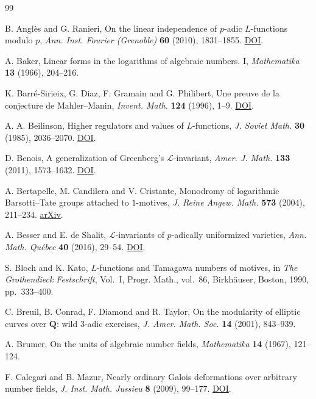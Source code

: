 \documentclass[11pt]{amsart}
\numberwithin{equation}{section}
\theoremstyle{definition}
\theoremstyle{remark}
\newcommand{\Q}{\mathbf Q}
\begin{document}
\begin{thebibliography}{99}

B. Angl\`es and G. Ranieri, On the linear independence of $p$-adic
$L$-functions modulo $p$, \emph{Ann. Inst. Fourier (Grenoble)}
\textbf{60} (2010), 1831--1855.
\href{https://doi.org/10.5802/aif.2573}{DOI}.

A. Baker, Linear forms in the logarithms of algebraic numbers. I,
\emph{Mathematika} \textbf{13} (1966), 204--216.

K. Barr\'e-Sirieix, G. Diaz, F. Gramain and G. Philibert,
Une preuve de la conjecture de Mahler--Manin,
\emph{Invent. Math.} \textbf{124} (1996), 1--9.
\href{https://doi.org/10.1007/s002220050044}{DOI}.

A. A. Beilinson, Higher regulators and values of $L$-functions,
\emph{J. Soviet Math.} \textbf{30} (1985), 2036--2070.
\href{https://doi.org/10.1007/BF02105861}{DOI}.

D. Benois, A generalization of Greenberg's $\mathcal L$-invariant,
\emph{Amer. J. Math.} \textbf{133} (2011), 1573--1632.
\href{https://doi.org/10.1353/ajm.2011.0043}{DOI}.

A. Bertapelle, M. Candilera and V. Cristante,
Monodromy of logarithmic Barsotti--Tate groups attached to $1$-motives,
\emph{J. Reine Angew. Math.} \textbf{573} (2004), 211--234.
\href{https://arxiv.org/abs/math/0307059}{arXiv}.

A. Besser and E. de Shalit, $\mathcal L$-invariants of $p$-adically
uniformized varieties, \emph{Ann. Math. Qu\'ebec} \textbf{40} (2016), 29--54.
\href{https://doi.org/10.1007/s40316-015-0047-1}{DOI}.

S. Bloch and K. Kato, $L$-functions and Tamagawa numbers of motives,
in \emph{The Grothendieck Festschrift}, Vol.~I, Progr. Math.,
vol.~86, Birkh\"auser, Boston, 1990, pp.~333--400.

C. Breuil, B. Conrad, F. Diamond and R. Taylor,
On the modularity of elliptic curves over $\Q$: wild $3$-adic exercises,
\emph{J. Amer. Math. Soc.} \textbf{14} (2001), 843--939.

A. Brumer, On the units of algebraic number fields,
\emph{Mathematika} \textbf{14} (1967), 121--124.

F. Calegari and B. Mazur, Nearly ordinary Galois deformations over
arbitrary number fields, \emph{J. Inst. Math. Jussieu}
\textbf{8} (2009), 99--177.
\href{https://doi.org/10.1017/S1474748008000327}{DOI}.


\end{thebibliography}
\end{document}

